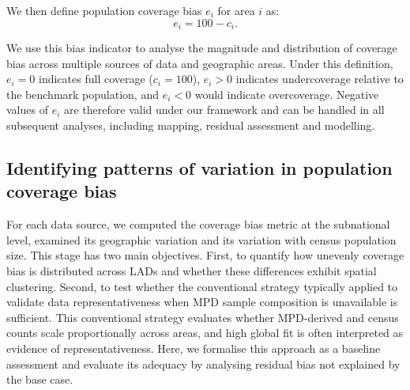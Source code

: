 \documentclass[]{rsos}%
\begin{document}
We then define population coverage bias \(e_i\) for area \(i\) as:
\begin{equation} \label{eq:size-bias}
e_i = 100 - c_i.
\end{equation}

We use this bias indicator to analyse the magnitude and distribution of
coverage bias across multiple sources of data and geographic areas.
Under this definition, \(e_i = 0\) indicates full coverage (\(c_i = 100\)),
\(e_i > 0\) indicates undercoverage relative to the benchmark population,
and \(e_i < 0\) would indicate overcoverage. Negative values of \(e_i\) are
therefore valid under our framework and can be handled in all subsequent
analyses, including mapping, residual assessment and modelling.

\subsection{Identifying patterns of variation in population coverage bias}\label{identifying-patterns-of-variation-in-population-coverage-bias}

For each data source, we computed the coverage bias metric at the
subnational level, examined its geographic variation and its variation
with census population size. This stage has two main objectives. First,
to quantify how unevenly coverage bias is distributed across LADs and
whether these differences exhibit spatial clustering. Second, to test
whether the conventional strategy typically applied to validate data
representativeness when MPD sample composition is unavailable
\citep{renninger2025, renninger2026, wang2022, moro2021, cabrera25} is
sufficient. This conventional strategy evaluates whether MPD-derived and
census counts scale proportionally across areas, and high global fit is
often interpreted as evidence of representativeness. Here, we formalise
this approach as a baseline assessment and evaluate its adequacy by
analysing residual bias not explained by the base case.
\end{document}
